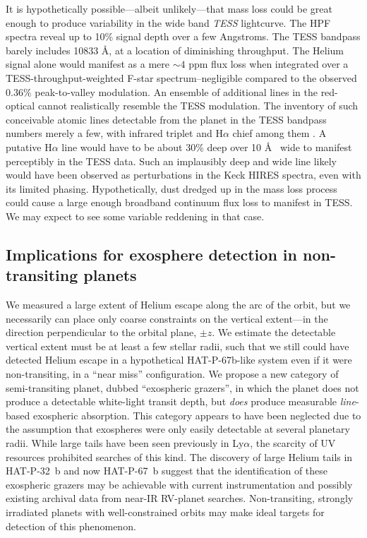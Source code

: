 \documentclass[twocolumn]{aastex631}
\begin{document}
It is hypothetically possible---albeit unlikely---that mass loss could be great enough to produce variability in the wide band \emph{TESS} lightcurve.  The HPF spectra reveal up to 10\% signal depth over a few Angstroms.  The TESS bandpass barely includes 10833 \AA, at a location of diminishing throughput.  The Helium signal alone would manifest as a mere $\sim4$ ppm flux loss when integrated over a TESS-throughput-weighted F-star spectrum--negligible compared to the observed $0.36\%$ peak-to-valley modulation.  An ensemble of additional lines in the red-optical cannot realistically resemble the TESS modulation.  The inventory of such conceivable atomic lines detectable from the planet in the TESS bandpass numbers merely a few, with  infrared triplet and H$\alpha$ chief among them \citep{2023arXiv230606971L}.   A putative H$\alpha$ line would have to be about 30\% deep over 10 \AA~ wide to manifest perceptibly in the TESS data.  Such an implausibly deep and wide line likely would have been observed as perturbations in the Keck HIRES spectra, even with its limited phasing.  Hypothetically, dust dredged up in the mass loss process could cause a large enough broadband continuum flux loss to manifest in TESS.  We may expect to see some variable reddening in that case.  

\subsection{Implications for exosphere detection in non-transiting planets}

We measured a large extent of Helium escape along the arc of the orbit, but we necessarily can place only coarse constraints on the vertical extent---in the direction perpendicular to the orbital plane, $\pm z$.  We estimate the detectable vertical extent must be at least a few stellar radii, such that we still could have detected Helium escape in a hypothetical HAT-P-67b-like system even if it were non-transiting, in a ``near miss'' configuration.  We propose a new category of semi-transiting planet, dubbed ``exospheric grazers'', in which the planet does not produce a detectable white-light transit depth, but \emph{does} produce measurable \emph{line}-based exospheric absorption.  This category appears to have been neglected due to the assumption that exospheres were only easily detectable at several planetary radii.  While large tails have been seen previously in Ly$\alpha$, the scarcity of UV resources prohibited searches of this kind.  The discovery of large Helium tails in HAT-P-32~b \citep{doi:10.1126/sciadv.adf8736} and now HAT-P-67~b suggest that the identification of these exospheric grazers may be achievable with current instrumentation and possibly existing archival data from near-IR RV-planet searches.  Non-transiting, strongly irradiated planets with well-constrained orbits may make ideal targets for detection of this phenomenon.
\end{document}
